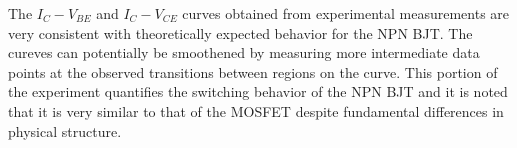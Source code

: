 The $I_C - V_{BE}$ and $I_C - V_{CE}$ curves obtained from experimental measurements are very consistent with theoretically expected behavior for the NPN BJT. The cureves can potentially be smoothened by measuring more intermediate data points at the observed transitions between regions on the curve. This portion of the experiment quantifies the switching behavior of the NPN BJT and it is noted that it is very similar to that of the MOSFET despite fundamental differences in physical structure.